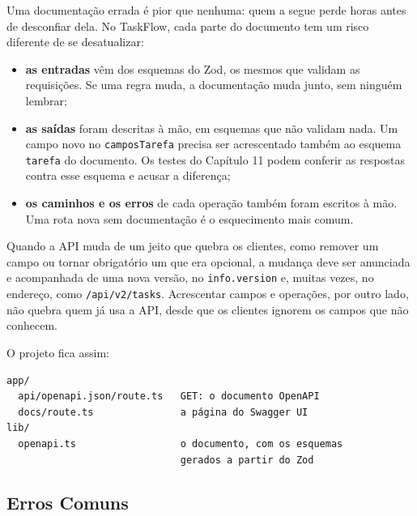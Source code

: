 Uma documentação errada é pior que nenhuma: quem a segue perde horas antes de desconfiar dela. No TaskFlow, cada parte do documento tem um risco diferente de se desatualizar:

\begin{itemize}
  \item \textbf{as entradas} vêm dos esquemas do Zod, os mesmos que validam as requisições. Se uma regra muda, a documentação muda junto, sem ninguém lembrar;
  \item \textbf{as saídas} foram descritas à mão, em esquemas que não validam nada. Um campo novo no \texttt{camposTarefa} precisa ser acrescentado também ao esquema \texttt{tarefa} do documento. Os testes do Capítulo 11 podem conferir as respostas contra esse esquema e acusar a diferença;
  \item \textbf{os caminhos e os erros} de cada operação também foram escritos à mão. Uma rota nova sem documentação é o esquecimento mais comum.
\end{itemize}

Quando a API muda de um jeito que quebra os clientes, como remover um campo ou tornar obrigatório um que era opcional, a mudança deve ser anunciada e acompanhada de uma nova versão, no \texttt{info.version} e, muitas vezes, no endereço, como \texttt{/api/v2/tasks}. Acrescentar campos e operações, por outro lado, não quebra quem já usa a API, desde que os clientes ignorem os campos que não conhecem.

O projeto fica assim:

\begin{codigo}
\begin{Verbatim}[breaklines=true, breaksymbolleft={}, fontsize=\footnotesize]
app/
  api/openapi.json/route.ts   GET: o documento OpenAPI
  docs/route.ts               a página do Swagger UI
lib/
  openapi.ts                  o documento, com os esquemas
                              gerados a partir do Zod
\end{Verbatim}
\end{codigo}

\subsection{Erros Comuns}

